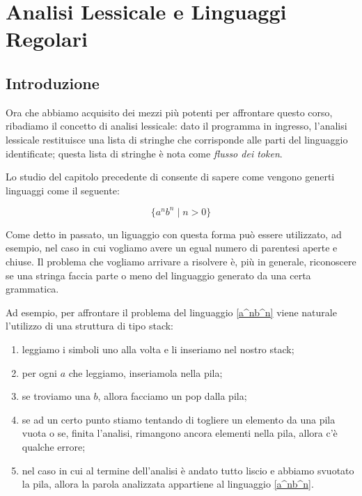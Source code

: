 \documentclass[class=book, crop=false, oneside, 12pt]{standalone}
\begin{document}
\chapter{Analisi Lessicale e Linguaggi Regolari}

\section{Introduzione}

Ora che abbiamo acquisito dei mezzi più potenti per affrontare questo corso, ribadiamo il concetto di analisi lessicale: dato il programma in ingresso, l'analisi lessicale restituisce una lista di stringhe che corrisponde alle parti del linguaggio identificate; questa lista di stringhe è nota come \emph{flusso dei token}.

Lo studio del capitolo precedente di consente di sapere come vengono generti linguaggi come il seguente:

\begin{equation*}
    \label{a^nb^n}
    \{ a^n b^n \mid n > 0 \}    
\end{equation*}

Come detto in passato, un liguaggio con questa forma può essere utilizzato, ad esempio, nel caso in cui vogliamo avere un egual numero di parentesi aperte e chiuse.
Il problema che vogliamo arrivare a risolvere è, più in generale, riconoscere se una stringa faccia parte o meno del linguaggio generato da una certa grammatica.

Ad esempio, per affrontare il problema del linguaggio \ref{a^nb^n} viene naturale l'utilizzo di una struttura di tipo stack:

\begin{enumerate}
    \item leggiamo i simboli uno alla volta e li inseriamo nel nostro stack;
    \item per ogni \(a\) che leggiamo, inseriamola nella pila;
    \item se troviamo una \(b\), allora facciamo un pop dalla pila;
    \item se ad un certo punto stiamo tentando di togliere un elemento da una pila vuota o se, finita l’analisi, rimangono ancora elementi nella pila, allora c’è qualche errore;
    \item nel caso in cui al termine dell’analisi è andato tutto liscio e abbiamo svuotato la pila, allora la parola analizzata appartiene al linguaggio \ref{a^nb^n}.
\end{enumerate} 
\end{document}
